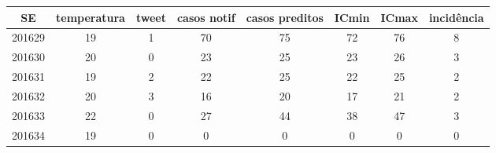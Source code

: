 \begin{tabular}{c|ccccccc}
  \hline
SE & temperatura & tweet & casos notif & casos preditos & ICmin & ICmax & incidência \\ 
  \hline
201629 & 19 & 1 & 70 & 75 & 72 & 76 & 8 \\ 
  201630 & 20 & 0 & 23 & 25 & 23 & 26 & 3 \\ 
  201631 & 19 & 2 & 22 & 25 & 22 & 25 & 2 \\ 
  201632 & 20 & 3 & 16 & 20 & 17 & 21 & 2 \\ 
  201633 & 22 & 0 & 27 & 44 & 38 & 47 & 3 \\ 
  201634 & 19 & 0 & 0 & 0 & 0 & 0 & 0 \\ 
   \hline
\end{tabular}
